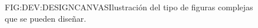 \begin{figure}{FIG:DEV:DESIGNCANVAS}{Ilustración del tipo de figuras complejas que se pueden diseñar.}
\end{figure}


\begin{comment}
En esta etapa se desarrolla gran parte del módulo del Canvas, que será el núcleo de los módulos de la aplicación destinados al diseño de los \dfnpl{espacio-jugable}. Las clases más destacables en este módulo son Canvas y Grid.

La implementación de la clase Canvas atiende a las siguientes funcionalidades:
\begin{enumerate}
	\item detección e interpretación del input de un usuario para añadir o eliminar rectángulos del espacio jugable.
	\item uniones, intersecciones y substracciones de rectángulos con elementos del espacio jugable.
	\item almacenamiento de los espacios jugables descritos por el usuario.
	\item conversión de los elementos del espacio jugable a regiones, para la posterior conversión del diseño a un grafo.
\end{enumerate}

La primera de estas funcionalidades se lleva a cabo detectando inputs del ratón sobre el Canvas. Un input válido se interpreta como la acción de pulsar una tecla del ratón, a la que llamamos comienzo, el movimiento del ratón y la acción de soltar dicha tecla del ratón, a la que llamaremos final.
Las coordenadas del comienzo y del final determinan las coordenadas de las dos esquinas opuestas del rectángulo que describe el usuario con el input, siempre y cuando dicho rectángulo tenga área mayor que cero. Estas coordenadas, sin embargo, se deben rectificar para que el rectángulo se ajuste a la rejilla.
La clase Grid representa dicha rejilla y, mediante métodos como \textit{nearestPoint}, permite, dado un punto, determinar las coordenadas del punto de la rejilla. Haciendo uso de esto, la clase Canvas puede ajustar los rectángulos descritos por el usuario a la rejilla.
La distinción de adición o eliminación de dicho rectángulo se llevaba a cabo teniendo en cuenta qué tecla del ratón fuera pulsada.


\end{comment}
